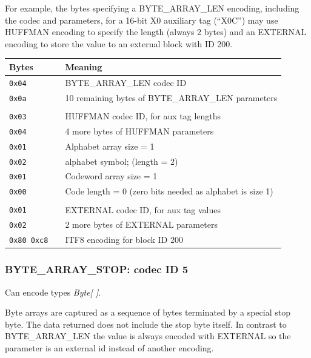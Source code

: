 \documentclass[a4paper]{article}
\begin{document}
For example, the bytes specifying a BYTE\_ARRAY\_LEN encoding, including the codec and parameters, for a 16-bit X0 auxiliary tag (``X0C'') may use HUFFMAN encoding to specify the length (always 2 bytes) and an EXTERNAL encoding to store the value to an external block with ID 200.

\begin{tabular}{lll}
\hline
\textbf{Bytes} & & \textbf{Meaning}\\
\hline
\texttt{0x04}         & & BYTE\_ARRAY\_LEN codec ID                                    \\
\texttt{0x0a}         & & 10 remaining bytes of BYTE\_ARRAY\_LEN parameters            \\
\\
\texttt{0x03}         & & HUFFMAN codec ID, for aux tag lengths                        \\
\texttt{0x04}         & & 4 more bytes of HUFFMAN parameters                           \\
\texttt{0x01}         & & Alphabet array size = 1                                      \\
\texttt{0x02}         & & alphabet symbol; (length = 2)                                \\
\texttt{0x01}         & & Codeword array size = 1                                      \\
\texttt{0x00}         & & Code length = 0 (zero bits needed as alphabet is size 1)     \\
\\
\texttt{0x01}         & & EXTERNAL codec ID, for aux tag values                        \\
\texttt{0x02}         & & 2 more bytes of EXTERNAL parameters                          \\
\texttt{0x80 0xc8}    & & ITF8 encoding for block ID 200                               \\
\hline
\end{tabular}



\subsubsection*{BYTE\_ARRAY\_STOP: codec ID 5}

Can encode types \textit{Byte[ ]}.

Byte arrays are captured as a sequence of bytes terminated by a special stop byte.
The data returned does not include the stop byte itself.
In contrast to BYTE\_ARRAY\_LEN the value is always encoded with EXTERNAL so the parameter is an external id instead of another encoding.
\end{document}
